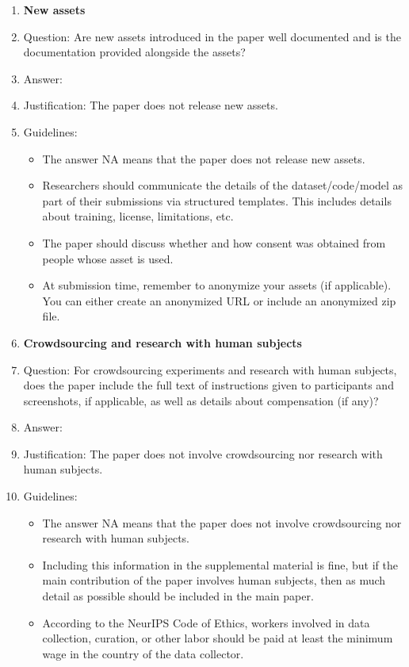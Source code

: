 \documentclass{article}
\theoremstyle{definition}
\begin{document}
\begin{enumerate}
\item {\bf New assets}
    \item[] Question: Are new assets introduced in the paper well documented and is the documentation provided alongside the assets?
    \item[] Answer: \answerNA{} %
    \item[] Justification: The paper does not release new assets.
    \item[] Guidelines:
    \begin{itemize}
        \item The answer NA means that the paper does not release new assets.
        \item Researchers should communicate the details of the dataset/code/model as part of their submissions via structured templates. This includes details about training, license, limitations, etc. 
        \item The paper should discuss whether and how consent was obtained from people whose asset is used.
        \item At submission time, remember to anonymize your assets (if applicable). You can either create an anonymized URL or include an anonymized zip file.
    \end{itemize}

\item {\bf Crowdsourcing and research with human subjects}
    \item[] Question: For crowdsourcing experiments and research with human subjects, does the paper include the full text of instructions given to participants and screenshots, if applicable, as well as details about compensation (if any)? 
    \item[] Answer: \answerNA{} %
    \item[] Justification: The paper does not involve crowdsourcing nor research with human subjects.
    \item[] Guidelines:
    \begin{itemize}
        \item The answer NA means that the paper does not involve crowdsourcing nor research with human subjects.
        \item Including this information in the supplemental material is fine, but if the main contribution of the paper involves human subjects, then as much detail as possible should be included in the main paper. 
        \item According to the NeurIPS Code of Ethics, workers involved in data collection, curation, or other labor should be paid at least the minimum wage in the country of the data collector. 
    \end{itemize}


\end{enumerate}
\end{document}
